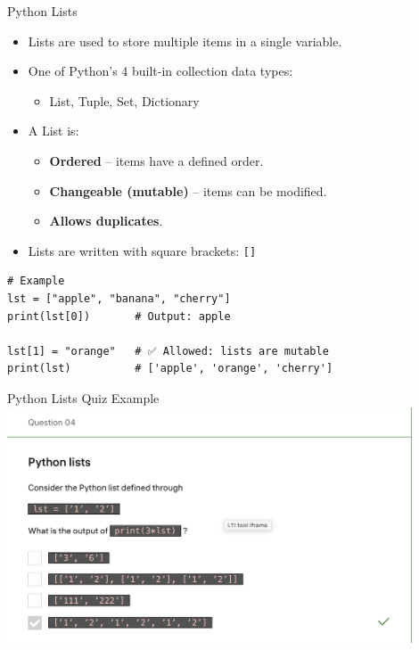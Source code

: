 \documentclass[aspectratio=169]{beamer}
\begin{document}
\begin{frame}[fragile]{Python Lists}
\begin{itemize}
  \item Lists are used to store multiple items in a single variable.
  \item One of Python’s 4 built-in collection data types:
    \begin{itemize}
      \item List, Tuple, Set, Dictionary
    \end{itemize}
  \item A List is:
    \begin{itemize}
      \item \textbf{Ordered} – items have a defined order.
      \item \textbf{Changeable (mutable)} – items can be modified.
      \item \textbf{Allows duplicates}.
    \end{itemize}
  \item Lists are written with square brackets: \texttt{[]}
\end{itemize}

\begin{verbatim}
# Example
lst = ["apple", "banana", "cherry"]
print(lst[0])       # Output: apple

lst[1] = "orange"   # ✅ Allowed: lists are mutable
print(lst)          # ['apple', 'orange', 'cherry']
\end{verbatim}
\end{frame}

\begin{frame}{Python Lists Quiz Example}
  \centering
  \includegraphics[width=0.9\textwidth]{lists_quiz.png}
\end{frame}
\end{document}

